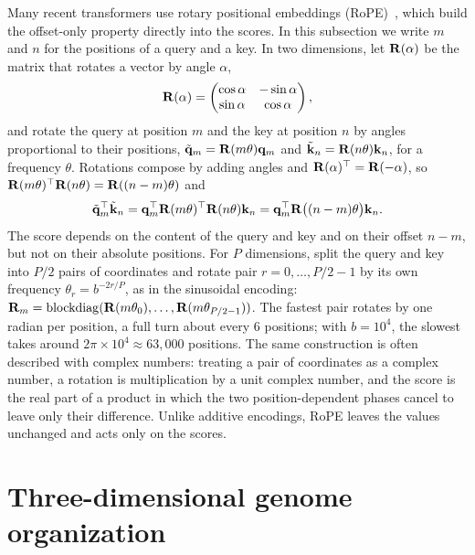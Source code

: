 Many recent transformers use rotary positional embeddings (RoPE)~\citep{su2024}, which build the offset-only property directly into the scores. In this subsection we write $m$ and $n$ for the positions of a query and a key. In two dimensions, let $\mathbf{R}(\alpha)$ be the matrix that rotates a vector by angle $\alpha$,
\begin{equation}
  \mathbf{R}(\alpha) = \begin{pmatrix}\cos\alpha & -\sin\alpha\\ \sin\alpha & \cos\alpha\end{pmatrix},
\end{equation}
and rotate the query at position $m$ and the key at position $n$ by angles proportional to their positions, $\tilde{\mathbf{q}}_m=\mathbf{R}(m\theta)\mathbf{q}_m$ and $\tilde{\mathbf{k}}_n=\mathbf{R}(n\theta)\mathbf{k}_n$, for a frequency $\theta$. Rotations compose by adding angles and $\mathbf{R}(\alpha)^\top=\mathbf{R}(-\alpha)$, so $\mathbf{R}(m\theta)^\top\mathbf{R}(n\theta)=\mathbf{R}((n-m)\theta)$ and
\begin{equation}
  \tilde{\mathbf{q}}_m^\top\tilde{\mathbf{k}}_n = \mathbf{q}_m^\top\mathbf{R}(m\theta)^\top\mathbf{R}(n\theta)\mathbf{k}_n = \mathbf{q}_m^\top\mathbf{R}\big((n-m)\theta\big)\mathbf{k}_n .
\end{equation}
The score depends on the content of the query and key and on their offset $n-m$, but not on their absolute positions. For $P$ dimensions, split the query and key into $P/2$ pairs of coordinates and rotate pair $r=0,\dots,P/2-1$ by its own frequency $\theta_r=b^{-2r/P}$, as in the sinusoidal encoding: $\mathbf{R}_m=\operatorname{blockdiag}(\mathbf{R}(m\theta_0),\dots,\mathbf{R}(m\theta_{P/2-1}))$. The fastest pair rotates by one radian per position, a full turn about every 6 positions; with $b=10^4$, the slowest takes around $2\pi\times10^4\approx63{,}000$ positions. The same construction is often described with complex numbers: treating a pair of coordinates as a complex number, a rotation is multiplication by a unit complex number, and the score is the real part of a product in which the two position-dependent phases cancel to leave only their difference. Unlike additive encodings, RoPE leaves the values unchanged and acts only on the scores.

\section{Three-dimensional genome organization}
\label{sec:hic}


